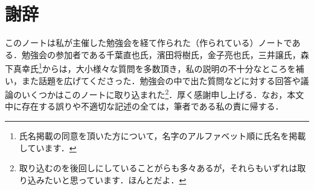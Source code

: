 \section*{謝辞}

このノートは私が主催した勉強会を経て作られた（作られている）ノートである．勉強会の参加者である千葉直也氏，濱田将樹氏，金子亮也氏，三井譲氏，森下真幸氏\footnote{氏名掲載の同意を頂いた方について，名字のアルファベット順に氏名を掲載しています．}からは，大小様々な質問を多数頂き，私の説明の不十分なところを補い，また話題を広げてくださった．勉強会の中で出た質問などに対する回答や議論のいくつかはこのノートに取り込まれた\footnote{取り込むのを後回しにしていることがらも多々あるが，それらもいずれは取り込みたいと思っています．ほんとだよ．}．厚く感謝申し上げる．なお，本文中に存在する誤りや不適切な記述の全ては，筆者である私の責に帰する．